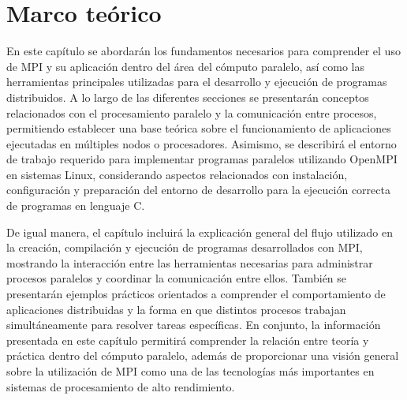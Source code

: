 ﻿%

\chapter{Marco teórico}

En este capítulo se abordarán los fundamentos necesarios para comprender el uso de MPI y su aplicación dentro del área del cómputo paralelo, así como las herramientas principales utilizadas para el desarrollo y ejecución de programas distribuidos. A lo largo de las diferentes secciones se presentarán conceptos relacionados con el procesamiento paralelo y la comunicación entre procesos, permitiendo establecer una base teórica sobre el funcionamiento de aplicaciones ejecutadas en múltiples nodos o procesadores. Asimismo, se describirá el entorno de trabajo requerido para implementar programas paralelos utilizando OpenMPI en sistemas Linux, considerando aspectos relacionados con instalación, configuración y preparación del entorno de desarrollo para la ejecución correcta de programas en lenguaje C.

De igual manera, el capítulo incluirá la explicación general del flujo utilizado en la creación, compilación y ejecución de programas desarrollados con MPI, mostrando la interacción entre las herramientas necesarias para administrar procesos paralelos y coordinar la comunicación entre ellos. También se presentarán ejemplos prácticos orientados a comprender el comportamiento de aplicaciones distribuidas y la forma en que distintos procesos trabajan simultáneamente para resolver tareas específicas. En conjunto, la información presentada en este capítulo permitirá comprender la relación entre teoría y práctica dentro del cómputo paralelo, además de proporcionar una visión general sobre la utilización de MPI como una de las tecnologías más importantes en sistemas de procesamiento de alto rendimiento.


